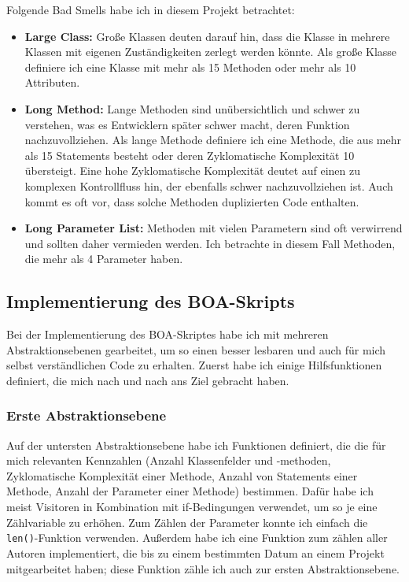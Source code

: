 \documentclass[12pt]{article}
\begin{document}
Folgende Bad Smells habe ich in diesem Projekt betrachtet:
\begin{itemize}
	\item \textbf{Large Class:} Große Klassen deuten darauf hin, dass die Klasse in mehrere Klassen mit eigenen Zuständigkeiten zerlegt werden könnte. \cite{fowler2018refactoring}
	Als große Klasse definiere ich eine Klasse mit mehr als 15 Methoden oder mehr als 10 Attributen.
	
	\item \textbf{Long Method:} Lange Methoden sind unübersichtlich und schwer zu verstehen, was es Entwicklern später schwer macht, deren Funktion nachzuvollziehen. \cite{fowler2018refactoring}
	Als lange Methode definiere ich eine Methode, die aus mehr als 15 Statements besteht oder deren Zyklomatische Komplexität 10 übersteigt.
	Eine hohe Zyklomatische Komplexität deutet auf einen zu komplexen Kontrollfluss hin, der ebenfalls schwer nachzuvollziehen ist.
	Auch kommt es oft vor, dass solche Methoden duplizierten Code enthalten. \cite{fowler2018refactoring}
	
	\item \textbf{Long Parameter List:} Methoden mit vielen Parametern sind oft verwirrend und sollten daher vermieden werden. \cite{fowler2018refactoring}
	Ich betrachte in diesem Fall Methoden, die mehr als 4 Parameter haben.
\end{itemize}

\subsection{Implementierung des BOA-Skripts}
Bei der Implementierung des BOA-Skriptes habe ich mit mehreren Abstraktionsebenen gearbeitet, um so einen besser lesbaren und auch für mich selbst verständlichen Code zu erhalten.
Zuerst habe ich einige Hilfsfunktionen definiert, die mich nach und nach ans Ziel gebracht haben.

\subsubsection{Erste Abstraktionsebene}
Auf der untersten Abstraktionsebene habe ich Funktionen definiert, die die für mich relevanten Kennzahlen (Anzahl Klassenfelder und -methoden, Zyklomatische Komplexität einer Methode, Anzahl von Statements einer Methode, Anzahl der Parameter einer Methode) bestimmen.
Dafür habe ich meist Visitoren in Kombination mit if-Bedingungen verwendet, um so je eine Zählvariable zu erhöhen.
Zum Zählen der Parameter konnte ich einfach die \texttt{len()}-Funktion verwenden.
Außerdem habe ich eine Funktion zum zählen aller Autoren implementiert, die bis zu einem bestimmten Datum an einem Projekt mitgearbeitet haben; diese Funktion zähle ich auch zur ersten Abstraktionsebene.
\end{document}
